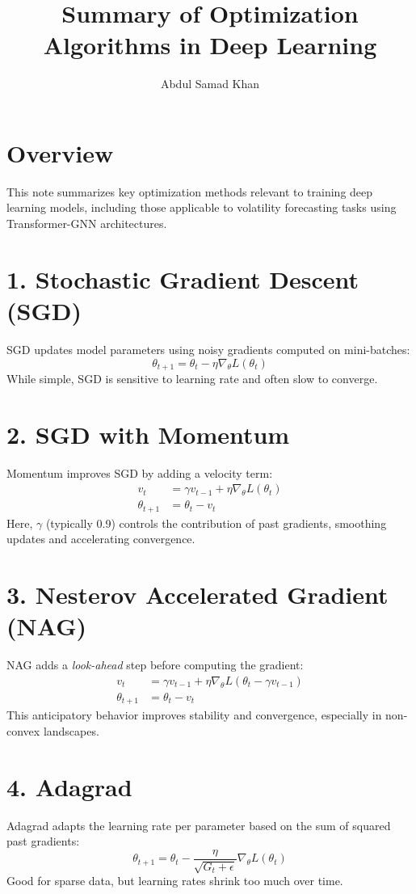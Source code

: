 \documentclass[10pt]{article}
\title{\textbf{Summary of Optimization Algorithms in Deep Learning}}
\author{Abdul Samad Khan}
\date{}
\begin{document}
\maketitle

\section*{Overview}
This note summarizes key optimization methods relevant to training deep learning models, including those applicable to volatility forecasting tasks using Transformer-GNN architectures.

\section*{1. Stochastic Gradient Descent (SGD)}
SGD updates model parameters using noisy gradients computed on mini-batches:
\[
\theta_{t+1} = \theta_t - \eta \nabla_\theta L(\theta_t)
\]
While simple, SGD is sensitive to learning rate and often slow to converge.

\section*{2. SGD with Momentum}
Momentum improves SGD by adding a velocity term:
\begin{align*}
v_t &= \gamma v_{t-1} + \eta \nabla_\theta L(\theta_t) \\
\theta_{t+1} &= \theta_t - v_t
\end{align*}
Here, $\gamma$ (typically 0.9) controls the contribution of past gradients, smoothing updates and accelerating convergence.

\section*{3. Nesterov Accelerated Gradient (NAG)}
NAG adds a \emph{look-ahead} step before computing the gradient:
\begin{align*}
v_t &= \gamma v_{t-1} + \eta \nabla_\theta L(\theta_t - \gamma v_{t-1}) \\
\theta_{t+1} &= \theta_t - v_t
\end{align*}
This anticipatory behavior improves stability and convergence, especially in non-convex landscapes.

\section*{4. Adagrad}
Adagrad adapts the learning rate per parameter based on the sum of squared past gradients:
\[
\theta_{t+1} = \theta_t - \frac{\eta}{\sqrt{G_t + \epsilon}} \nabla_\theta L(\theta_t)
\]
Good for sparse data, but learning rates shrink too much over time.
\end{document}
